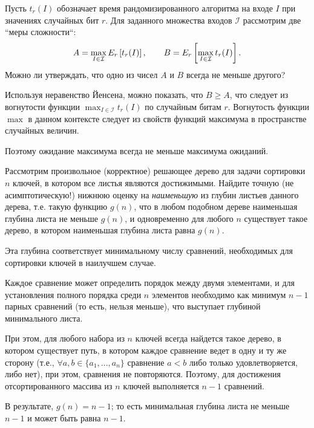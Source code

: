 \documentclass[11pt]{article}
\renewcommand{\ge}{\geqslant}   %
\begin{document}
\begin{problem}{5}
Пусть $t_r(I)$ обозначает время рандомизированного алгоритма на входе $I$ при значениях случайных бит $r$. Для заданного множества входов $\mathcal{I}$
рассмотрим две ``меры сложности``:
$$
	A = \mathop{\rm max}_{I \in \mathcal{I}} E_r \left[ t_r(I) \right], \qquad
	B = E_r \left[ \mathop{\rm max}_{I \in \mathcal{I}} t_r(I) \right].
$$
Можно ли утверждать, что одно из чисел $A$ и $B$ всегда не меньше другого?
\end{problem}

\begin{solution}
	Используя неравенство Йенсена, можно показать, что $B \ge A$, что следует из вогнутости функции $\max_{I \in \mathcal{I}} t_r(I)$ по случайным битам $r$. Вогнутость функции $\max$ в данном контексте следует из свойств функций максимума в пространстве случайных величин.

	Поэтому ожидание максимума всегда не меньше максимума ожиданий.
\end{solution}

\begin{problem}{15}
Рассмотрим произвольное (корректное) решающее дерево для задачи сортировки $n$ ключей, в котором все листья являются достижимыми.
Найдите точную (не асимптотическую!) нижнюю оценку на \emph{наименьшую} из глубин листьев данного дерева, т.е.
такую функцию $g(n)$, что в любом подобном дереве наименьшая глубина листа не меньше $g(n)$,
и одновременно для любого $n$ существует такое дерево, в котором наименьшая глубина листа равна $g(n)$.
\end{problem}

\begin{solution}
	Эта глубина соответствует минимальному числу сравнений, необходимых для сортировки ключей в наилучшем случае.

	Каждое сравнение может определить порядок между двумя элементами, и для установления полного порядка среди $ n $ элементов необходимо как минимум $ n - 1 $ парных сравнений (то есть, нельзя меньше), что выступает глубиной минимального листа.

	При этом, для любого набора из $ n  $ ключей всегда найдется такое дерево, в котором существует путь, в котором каждое сравнение ведет в одну и ту же сторону (т.е., $ \forall a,b \in \{a_1, ..., a_n\} $ сравнение $ a < b $ либо только удовлетворяется, либо нет), при этом, сравнения не повторяются. Поэтому, для достижения отсортированного массива из $ n $ ключей выполняется $ n - 1 $ сравнений.

	В результате, $ g(n) = n - 1 $; то есть минимальная глубина листа не меньше $ n - 1 $ и может быть равна $ n - 1 $.

\end{solution}
\end{document}
